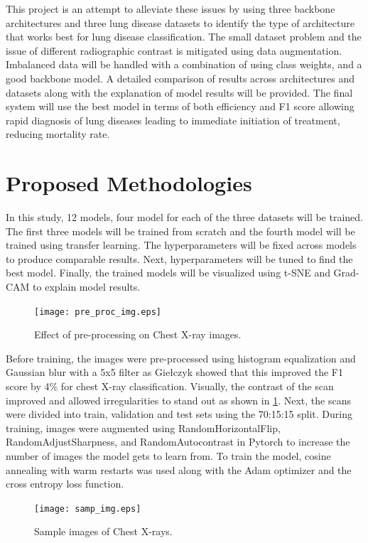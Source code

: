 \documentclass[10pt,twocolumn,letterpaper]{article}
\begin{document}
This project is an attempt to alleviate these issues by using three backbone architectures and three lung disease datasets to identify the type of architecture that works best for lung disease classification. The small dataset problem and the issue of different radiographic contrast \cite{andrew2022rad} is mitigated using data augmentation. Imbalanced data will be handled with a combination of using class weights, and a good backbone model. A detailed comparison of results across architectures and datasets along with the explanation of model results will be provided. The final system will use the best model in terms of both efficiency and F1 score allowing rapid diagnosis of lung diseases leading to immediate initiation of treatment, reducing mortality rate.
\section{Proposed Methodologies}
\label{sec:prop_method}
In this study, 12 models, four model for each of the three datasets will be trained. The first three models will be trained from scratch and the fourth model will be trained using transfer learning. The hyperparameters will be fixed across models to produce comparable results. Next, hyperparameters will be tuned to find the best model. Finally, the trained models will be visualized using t-SNE and Grad-CAM \cite{jacobgilpytorchcam} to explain model results. 
\begin{figure}[t]
  \centering
  \texttt{[image: pre\_proc\_img.eps]}  
   \caption{Effect of pre-processing on Chest X-ray images.}
   \vspace{-1.5em}
   \label{fig:pre_proc_img}
\end{figure}
Before training, the images were pre-processed using histogram equalization and Gaussian blur with a 5x5 filter as Giełczyk \etal \cite{gielczyk2022pre} showed that this improved the F1 score by 4\% for chest X-ray classification. Visually, the contrast of the scan improved and allowed irregularities to stand out as shown in \cref*{fig:pre_proc_img}. Next, the scans were divided into train, validation and test sets using the 70:15:15 split. During training, images were augmented using RandomHorizontalFlip, RandomAdjustSharpness, and RandomAutocontrast in Pytorch \cite{transforms} to increase the number of images the model gets to learn from. To train the model, cosine annealing with warm restarts \cite{loshchilov2016sgdr} was used along with the Adam optimizer \cite{kingma2014adam} and the cross entropy loss function. 
\begin{figure}[t]
  \centering
  \texttt{[image: samp\_img.eps]}  
   \caption{Sample images of Chest X-rays.}
   \vspace{-1em}
   \label{fig:sample_img}
\end{figure}
\end{document}

